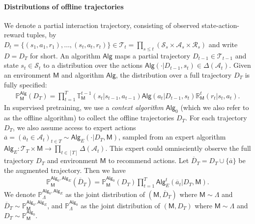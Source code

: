 \documentclass[10pt]{article}
\newcommand{\<}{\left\langle}
\renewcommand{\>}{\right\rangle}
\renewcommand{\P}{\mathbb{P}}
\newcommand{\inst}{{\mathsf{M}}}
\newcommand{\trajsp}{{\mathcal{T}}}
\newcommand{\widebar}[1]{\overline{#1}}
\newcommand{\transmodel}{{\mathbb T}}
\newcommand{\rewmodel}{{\mathbb R}}
\newcommand{\state}{{s}}
\newcommand{\action}{{a}}
\newcommand{\eaction}{{\widebar{a}}}%
\newcommand{\reward}{{r}}
\newcommand{\totlen}{{T}} %
\newcommand{\sAlg}{{\mathsf{Alg}}}
\newcommand{\dset}{{D}}
\newcommand{\adset}{{\widebar{D}}}  %
\newcommand{\prior}{{\Lambda}}
\newcommand{\statesp}{{\mathcal{S}}}
\newcommand{\actionsp}{{\mathcal{A}}}
\newcommand{\rewardsp}{{\mathcal{R}}}
\newcommand{\init}{{\mu_1}}
\newcommand{\shortexp}{{E}}
\newcommand{\authnote}[2]{{\scriptsize $\ll$\textsf{#1 notes: #2}$\gg$}}
\newcommand{\authnote}[2]{}
\newcommand{\lc}[1]{{\color{blue}\authnote{Licong}{#1}}}
\begin{document}
\paragraph{Distributions of offline trajectories} We denote a partial interaction trajectory, consisting of observed state-action-reward tuples, by $\dset_t=\{(\state_1,\action_1,\reward_1),\ldots,(\state_t,\action_t,\reward_t)\} \in \trajsp_t = \prod_{s \le t} (\statesp_s \times \actionsp_s \times \rewardsp_s)$ and write $\dset = \dset_{\totlen}$ for short. An algorithm $\sAlg$ maps a partial trajectory $\dset_{t-1} \in \trajsp_{t-1}$ and state $\state_t \in \statesp_t$ to a distribution over the actions $\sAlg(\cdot | \dset_{t-1}, \state_t) \in \Delta(\actionsp_t)$. Given an environment $\inst$ and algorithm $\sAlg$, the distribution over a full trajectory $\dset_\totlen$ is fully specified: 
\begin{align*}
\textstyle \P_{\inst}^{\sAlg}(\dset_\totlen) =
\prod_{t=1}^{\totlen}\transmodel_{\inst}^{t-1}(\state_{t}|\state_{t-1},\action_{t-1}) \sAlg(\action_t|\dset_{t-1},\state_t)\rewmodel_{\inst}^t(\reward_t|\state_t,\action_t).
\end{align*}
In supervised pretraining, we use a \textit{context algorithm} $\sAlg_0$ (which we also refer to as the offline algorithm) to collect the offline trajectories $\dset_\totlen$. For each trajectory $\dset_\totlen$, we also assume access to expert actions $\eaction = ( \eaction_t \in \actionsp_t )_{t \in \totlen} \sim \sAlg_{\shortexp}(\cdot | \dset_\totlen, \inst)$, sampled from an expert algorithm $\sAlg_{\shortexp}: \trajsp_\totlen \times \inst \to \prod_{t \in [\totlen]} \Delta(\actionsp_t)$. This expert could omnisciently observe the full trajectory $\dset_\totlen$ and environment $\inst$ to recommend actions. Let $\adset_\totlen = \dset_\totlen \cup \{ \eaction \}$ be the augmented trajectory. Then we have
\begin{align*}
\textstyle \P^{\sAlg_0,\sAlg_{\shortexp}}_{\inst}(\adset_\totlen)=\P^{\sAlg_0}_{\inst}(\dset_\totlen)\prod_{t=1}^\totlen \sAlg_{\shortexp}^t (\eaction_t|\dset_{\totlen},\inst).
\end{align*}
We denote $\P^{\sAlg_0,\sAlg_\shortexp}_{\prior}$ as the joint distribution of $(\inst,\adset_\totlen)$ where $\inst \sim \prior$ and $\adset_\totlen \sim \P^{\sAlg_0,\sAlg_\shortexp}_{\inst}$, and $\P^{\sAlg_0}_{\prior}$ as the joint distribution of $(\inst,\dset_\totlen)$ where $\inst \sim \prior$ and $\dset_\totlen \sim \P^{\sAlg_0}_{\inst}$. 
\end{document}
